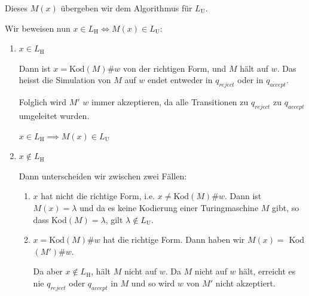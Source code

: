 \documentclass[a4paper, 11pt]{article}
\begin{document}
                        Dieses $M(x)$ übergeben wir dem Algorithmus für $L_{\text{U}}$. 
                
                        
                    Wir beweisen nun $x \in L_{\text{H}} \iff M(x) \in L_{\text{U}}$:
                
                        \begin{enumerate}[label=(\roman*)]
                            \item $x \in L_{\text{H}}$
                
                                Dann ist $x = \text{Kod}(M)\#w$ von der richtigen Form, und $M$ hält auf $w$. 
                                Das heisst die Simulation von $M$ auf $w$ endet entweder in $q_{reject}$ oder in $q_{accept}$. 
                                
                                Folglich wird $M'$ $w$ immer akzeptieren, da alle Transitionen zu $q_{reject}$ zu $q_{accept}$ umgeleitet wurden. 
                                
                                $x \in L_{\text{H}} \implies M(x) \in L_{\text{U}}$
                
                            \item $x \notin L_{\text{H}}$
                
                                Dann unterscheiden wir zwischen zwei Fällen:
                
                                \begin{enumerate}[label=(\alph*)]
                                    \item 
                                    
                                    $x$ hat nicht die richtige Form, i.e. $x \neq \text{Kod}(M)\#w$.
                                    Dann ist $M(x) = \lambda$ und da es keine Kodierung einer Turingmaschine $M$ gibt, so dass Kod$(M) = \lambda$, gilt   $\lambda \notin L_{\text{U}}$.
                            
                
                   
                    \item
                
                                    $x = \text{Kod}(M)\#w$ hat die richtige Form. Dann haben wir $M(x) = $ Kod$(M')\#w$.
                                    
                                    Da aber $x \notin L_{\text{H}}$, hält $M$ nicht auf $w$. Da $M$ nicht auf $w$ hält, erreicht es nie $q_{reject}$ oder $q_{accept}$ in $M$ und so wird $w$ von $M'$ nicht akzeptiert. 
                

\end{enumerate}
\end{enumerate}
\end{document}

